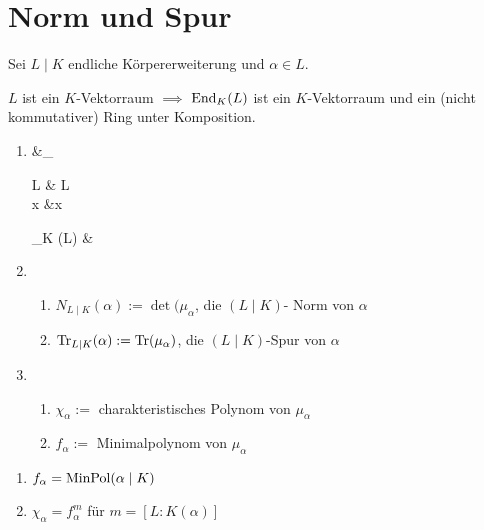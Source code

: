 \section{Norm und Spur}
Sei $L\mid K$ endliche Körpererweiterung und $\alpha \in L$.
\begin{remark}
	$L$ ist ein $K$-Vektorraum $\implies$ $\operatorname{End}_K (L)$ ist ein $K$-Vektorraum und ein (nicht kommutativer) Ring unter Komposition.
\end{remark}
\begin{definition}
	\begin{enumerate}[label={(\alph*)}]
		\item 
		\bgroup
		\zeroAmsmathAlignVSpaces*[-0.5\baselineskip]
		\begin{flalign*}
		 \;\;&\mu_{\alpha}\colon \begin{cases}
		L & \to L\\
		x &\mapsto \alpha x
		\end{cases} \in \End_K (L) &
		\end{flalign*}
		\egroup
		\item \begin{enumerate}[label=,left=0pt]
			\item $N_{L \mid K}(\alpha) := \det(\mu_{\alpha}$, die $(L \mid K)$- Norm von $\alpha$
			\item $\operatorname{Tr}_{L \mid K}(\alpha) := \operatorname{Tr}(\mu_{\alpha})$, die $(L\mid K)$-Spur von $\alpha$
		\end{enumerate}
		\item \begin{enumerate}[label=,left=0pt]
			\item $\chi_{\alpha} :=$ charakteristisches Polynom von $\mu_{\alpha}$
			\item $f_{\alpha} :=$ Minimalpolynom von $\mu_{\alpha}$
		\end{enumerate}
	\end{enumerate}
\end{definition}
\begin{lemma}
	\begin{enumerate}[label={(\alph*)}]
		\item $f_{\alpha} = \operatorname{MinPol}(\alpha \mid K)$
		\item $\chi_{\alpha} = f_{\alpha}^m$ für $m = [L:K(\alpha)]$
	\end{enumerate}
\end{lemma}
